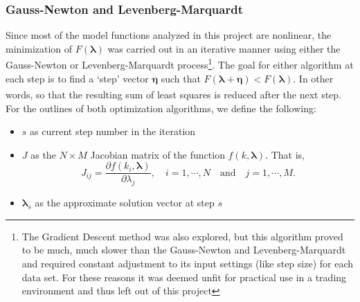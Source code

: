 \documentclass[12pt, a4paper, notitlepage]{article}
\numberwithin{equation}{subsection}
\numberwithin{figure}{subsection}
\numberwithin{table}{subsection}
\newcommand{\newpar}{\newline \newline}
\newcommand{\lambdaVect}{\pmb{\lambda}}
\begin{document}
\subsubsection{Gauss-Newton and Levenberg-Marquardt}\label{subsubsec:GNLM}

Since most of the model functions analyzed in this project are nonlinear, the minimization of $F(\lambdaVect)$ was carried out in an iterative manner using either the Gauss-Newton or Levenberg-Marquardt process\footnote{The Gradient Descent method was also explored, but this algorithm proved to be much, much slower than the Gauss-Newton and Levenberg-Marquardt and required constant adjustment to its input settings (like step size) for each data set.  For these reasons it was deemed unfit for practical use in a trading environment and thus left out of this project}.  The goal for either algorithm at each step is to find a `step' vector $\pmb{\eta}$ such that $F(\lambdaVect + \pmb{\eta}) < F(\lambdaVect)$.  In other words, so that the resulting sum of least squares is reduced after the next step\textsuperscript{\cite{Gavin}}.
\newpar
For the outlines of both optimization algorithms, we define the following:
\begin{itemize}
\item $s$ as current step number in the iteration 
\item $J$ as the $N \times M$ Jacobian matrix of the function $f(k,\lambdaVect)$.  That is, 
\begin{equation*}
	J_{ij} = \frac{\partial f(k_i,\lambdaVect)}{\partial \lambda_j}, \quad i = 1,\cdots, N \quad \text{and} \quad j = 1,\cdots, M.
\end{equation*}
\item $\lambdaVect_s$ as the approximate solution vector at step $s$
\end{itemize}
\end{document}
